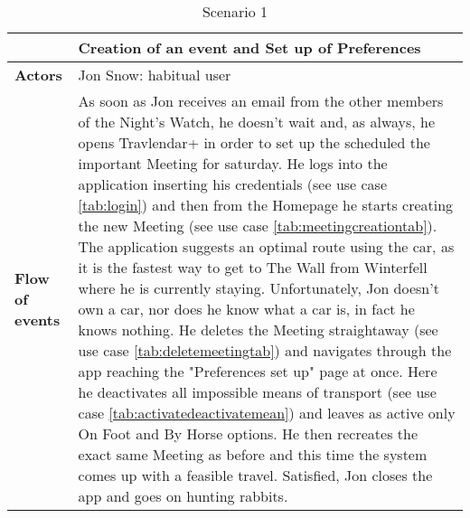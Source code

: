 \begin{table}[htp]
\begin{tabular}{lp{9cm}}
\hline
\bf\large  &\bf\large Creation of an event and Set up of Preferences\\
\hline
\hline

\bf Actors&Jon Snow: habitual user\\
\hline
\bf Flow of events&
As soon as Jon receives  an email from the other members of the Night's Watch, he doesn't wait and, as always, he opens Travlendar+ in order to set up the scheduled the important Meeting for saturday.
He logs into the application inserting his credentials (see use case \autoref{tab:login}) and then from the Homepage he starts creating the new Meeting (see use case \autoref{tab:meetingcreationtab}).
The application suggests an optimal route using the car, as it is the fastest way to get to The Wall from Winterfell where he is currently staying.
Unfortunately, Jon doesn't own a car, nor does he know what a car is, in fact he knows nothing. 
He deletes the Meeting straightaway (see use case \autoref{tab:deletemeetingtab}) and navigates through the app reaching the "Preferences set up" page at once.
Here he deactivates all impossible means of transport (see use case \autoref{tab:activatedeactivatemean}) and leaves as active only On Foot and By Horse options.
He then recreates the exact same Meeting as before and this time the system comes up with a feasible travel.
Satisfied, Jon closes the app and goes on hunting rabbits. 



\end{tabular}
\caption{Scenario 1} 
\label{tab:scenarioone}
\end{table}
